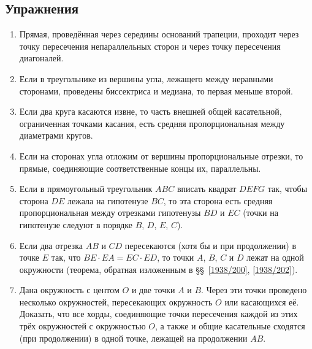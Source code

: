 \documentclass[oneside]{book}
\begin{document}
\subsection*{Упражнения}

\begin{center}
\end{center}

\begin{enumerate}

 \item
Прямая, проведённая через середины оснований трапеции, проходит через точку пересечения %
непараллельных сторон и через точку пересечения диагоналей.

 \item
Если в треугольнике из вершины угла, лежащего между неравными сторонами, проведены биссектриса и медиана, то первая меньше второй.

 \item
Если два круга касаются извне, то часть внешней общей касательной, ограниченная точками касания, есть средняя пропорциональная между диаметрами кругов.

 \item
Если на сторонах угла отложим от вершины пропорциональные отрезки, то прямые, соединяющие соответственные концы их, параллельны.

 \item
Если в прямоугольный треугольник $ABC$ вписать квадрат $DEFG$ так, чтобы сторона $DE$ лежала на гипотенузе $BC$, то эта сторона есть средняя пропорциональная между отрезками гипотенузы $BD$ и $EC$ (точки на гипотенузе следуют в порядке $B$, $D$, $E$, $C$).

 \item
Если два отрезка $AB$ и $CD$ пересекаются (хотя бы и при продолжении) в точке $E$ так, что $BE\cdot  EA=EC\cdot  ED$, то точки $A$, $B$, $C$ и $D$ лежат на одной окружности (теорема, обратная изложенным в §§~\ref{1938/200}, \ref{1938/202}). %

 \item
Дана окружность с центом $O$ и две точки $A$ и $B$.
Через эти точки проведено несколько окружностей, пересекающих окружность $O$ или касающихся её.
Доказать, что все хорды, соединяющие точки пересечения каждой из этих трёх окружностей с окружностью $O$, а также и общие касательные сходятся (при продолжении) в одной точке, лежащей на продолжении $AB$. %


\end{enumerate}
\end{document}
